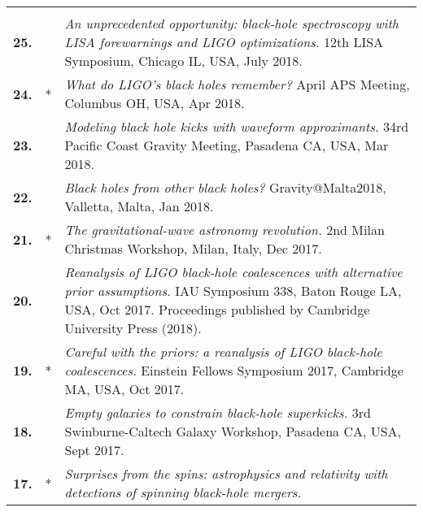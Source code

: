 \documentclass[11pt,letterpaper,sans]{moderncv}   %
\begin{document}
{\begin{longtable}{rp{0.4cm}p{15.8cm}}
\vspace{0.05cm}\\
%
\textbf{25.} & & \textit{An unprecedented opportunity: black-hole spectroscopy with LISA forewarnings and LIGO optimizations.}
\newline{} 12th LISA Symposium, Chicago IL, USA, July 2018.
\vspace{0.05cm}\\
%
\textbf{24.} & * & \textit{What do LIGO's black holes remember?}
\newline{} April APS Meeting, Columbus OH, USA, Apr 2018.
\vspace{0.05cm}\\
%
\textbf{23.} & & \textit{Modeling black hole kicks with waveform approximants.}
\newline{} 34rd Pacific Coast Gravity Meeting, Pasadena CA, USA, Mar 2018.
\vspace{0.05cm}\\
%
\textbf{22.} & & \textit{Black holes from other black holes?}
\newline{} Gravity@Malta2018, Valletta, Malta, Jan 2018.
\vspace{0.05cm}\\
%
\textbf{21.} & * & \textit{The gravitational-wave astronomy revolution.}
\newline{} 2nd Milan Christmas Workshop, Milan, Italy, Dec 2017.
\vspace{0.05cm}\\
%
\textbf{20.} &  & \textit{Reanalysis of LIGO black-hole coalescences with alternative prior assumptions.}
\newline{} IAU Symposium 338, Baton Rouge LA, USA, Oct 2017.
\newline{}Proceedings published by Cambridge University Press (2018).
\vspace{0.05cm}\\
%
\textbf{19.} & * & \textit{Careful with the priors: a reanalysis of LIGO black-hole coalescences.}
\newline{} Einstein Fellows Symposium 2017, Cambridge MA, USA, Oct 2017.
\vspace{0.05cm}\\
%
\textbf{18.} & & \textit{Empty galaxies to constrain black-hole superkicks.}
\newline{} 3rd Swinburne-Caltech Galaxy Workshop, Pasadena CA, USA, Sept 2017.
\vspace{0.05cm}\\
%
\textbf{17.} & * & \textit{Surprises from the spins: astrophysics and relativity with detections of spinning black-hole mergers.}

\end{longtable}}
\end{document}
